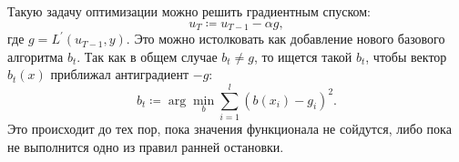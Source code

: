 Такую задачу оптимизации можно решить градиентным спуском: 
\[{u_T \coloneqq u_{T-1} - \alpha g,}\] 
где ${g = L^{'}(u_{T-1}, y)}$. Это можно истолковать как добавление нового базового алгоритма $b_t$. Так как в общем случае $b_t \neq g$, то ищется такой $b_t$, чтобы вектор $b_t(x)$ приближал антиградиент $-g$:
\[
	b_t \coloneqq \arg \min\limits_{b} \sum_{i=1}^l (b(x_i) - g_i)^2.
\]
Это происходит до тех пор, пока значения функционала не сойдутся, либо пока не выполнится одно из правил ранней остановки.
\iffalse
Градиентный бустинг — это метод машинного обучения, посвященный решению для задач классификации и регрессии, которая строит модель предсказания в форме ансамбля слабых предсказывающих моделей, обычно деревьев решений. Обучение
ансамбля проводится последовательно в отличие, например от бэггинга. На
каждой итерации вычисляются отклонения предсказаний уже обученного ансамбля на обучающей выборке. Следующая модель, которая будет добавлена в ансамбль будет предсказывать эти отклонения. Таким образом, добавив
предсказания нового дерева к предсказаниям обученного ансамбля мы можем
уменьшить среднее отклонение модели, которое является таргетом оптимизационной задачи. Новые деревья добавляются в ансамбль до тех пор, пока ошибка
уменьшается, либо пока не выполняется одно из правил ранней остановки.
\fi